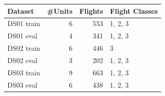 \begin{tabular}{lrrl}
\toprule
Dataset & \#Units & Flights & Flight Classes \\
\midrule
DS01 train & 6 & 553 & 1, 2, 3 \\
DS01 eval & 4 & 341 & 1, 2, 3 \\
DS02 train & 6 & 446 & 3 \\
DS02 eval & 3 & 202 & 1, 2, 3 \\
DS03 train & 9 & 663 & 1, 2, 3 \\
DS03 eval & 6 & 438 & 1, 2, 3 \\
\bottomrule
\end{tabular}